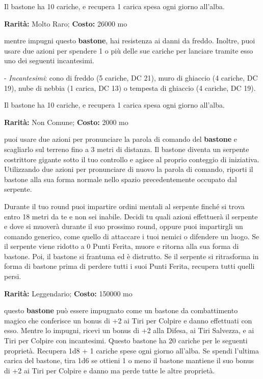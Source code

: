 \begin{multicols}{2}
Il bastone ha 10 cariche, e recupera 1 carica spesa ogni giorno all'alba.


\textbf{Rarità:} Molto Raro; \textbf{Costo:} 26000 mo

mentre impugni questo \textbf{bastone}, hai resistenza ai danni da freddo.
Inoltre, puoi usare due azioni per spendere 1 o più delle sue cariche per lanciare tramite esso uno dei seguenti incantesimi.

- \emph{Incantesimi}: cono di freddo (5 cariche, DC 21), muro di ghiaccio (4 cariche, DC 19), nube di nebbia (1 carica, DC 13) o tempesta di ghiaccio (4 cariche, DC 19).

Il bastone ha 10 cariche, e recupera 1 carica spesa ogni giorno all'alba.


\textbf{Rarità:} Non Comune; \textbf{Costo:} 2000 mo

puoi usare due azioni per pronunciare la parola di comando del \textbf{bastone} e scagliarlo sul terreno fino a 3 metri di distanza. Il bastone diventa un serpente costrittore gigante sotto il tuo controllo e agisce al proprio conteggio di iniziativa. Utilizzando due azioni per pronunciare di nuovo la parola di comando, riporti il bastone alla sua forma normale nello spazio precedentemente occupato dal serpente.

Durante il tuo round puoi impartire ordini mentali al serpente finché si trova entro 18 metri da te e non sei inabile. Decidi tu quali azioni effettuerà il serpente e dove si muoverà durante il suo prossimo round, oppure puoi impartirgli un comando generico, come quello di attaccare i tuoi nemici o difendere un luogo. Se il serpente viene ridotto a 0 Punti Ferita, muore e ritorna alla sua forma di bastone. Poi, il bastone si frantuma ed è distrutto. Se il serpente si ritrasforma in forma di bastone prima di perdere tutti i suoi Punti Ferita, recupera tutti quelli persi.


\textbf{Rarità:} Leggendario; \textbf{Costo:} 150000 mo

questo \textbf{bastone} può essere impugnato come un bastone da combattimento magico che conferisce un bonus di +2 ai Tiri per Colpire e danno effettuati con esso. Mentre lo impugni, ricevi un bonus di +2 alla Difesa, ai Tiri Salvezza, e ai Tiri per Colpire con incantesimi. Questo bastone ha 20 cariche per le seguenti proprietà. Recupera 1d8 + 1 cariche spese ogni giorno all'alba. Se spendi l'ultima carica del bastone, tira 1d6 se ottieni 1 o meno il bastone mantiene il suo bonus di +2 ai Tiri per Colpire e danno ma perde tutte le altre proprietà.


\end{multicols}
